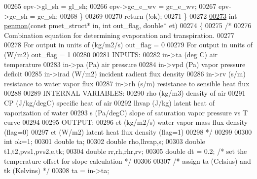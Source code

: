 \begin{DoxyCode}
00265         epv->gl\_sh   = gl\_sh;
00266         epv->gc\_e\_wv = gc\_e\_wv;
00267         epv->gc\_sh   = gc\_sh;
00268     \}
00269     
00270     \textcolor{keywordflow}{return} (!ok);
00271 \}
00272 
\hypertarget{canopy__et_8c_source_l00273}{}\hyperlink{canopy__et_8c_a5c8d396ed94c7e0f3f4c80dd3ecd046c}{00273} \textcolor{keywordtype}{int} \hyperlink{canopy__et_8c_a5c8d396ed94c7e0f3f4c80dd3ecd046c}{penmon}(\textcolor{keyword}{const} pmet\_struct* in, \textcolor{keywordtype}{int} out\_flag,   \textcolor{keywordtype}{double}* et)
00274 \{
00275     \textcolor{comment}{/*}
00276 \textcolor{comment}{    Combination equation for determining evaporation and transpiration. }
00277 \textcolor{comment}{    }
00278 \textcolor{comment}{    For output in units of (kg/m2/s)  out\_flag = 0}
00279 \textcolor{comment}{    For output in units of (W/m2)     out\_flag = 1}
00280 \textcolor{comment}{   }
00281 \textcolor{comment}{    INPUTS:}
00282 \textcolor{comment}{    in->ta     (deg C)   air temperature}
00283 \textcolor{comment}{    in->pa     (Pa)      air pressure}
00284 \textcolor{comment}{    in->vpd    (Pa)      vapor pressure deficit}
00285 \textcolor{comment}{    in->irad   (W/m2)    incident radient flux density}
00286 \textcolor{comment}{    in->rv     (s/m)     resistance to water vapor flux}
00287 \textcolor{comment}{    in->rh     (s/m)     resistance to sensible heat flux}
00288 \textcolor{comment}{}
00289 \textcolor{comment}{    INTERNAL VARIABLES:}
00290 \textcolor{comment}{    rho    (kg/m3)       density of air}
00291 \textcolor{comment}{    CP     (J/kg/degC)   specific heat of air}
00292 \textcolor{comment}{    lhvap  (J/kg)        latent heat of vaporization of water}
00293 \textcolor{comment}{    s      (Pa/degC)     slope of saturation vapor pressure vs T curve}
00294 \textcolor{comment}{}
00295 \textcolor{comment}{    OUTPUT:}
00296 \textcolor{comment}{    et     (kg/m2/s)     water vapor mass flux density  (flag=0)}
00297 \textcolor{comment}{    et     (W/m2)        latent heat flux density       (flag=1)}
00298 \textcolor{comment}{    */}
00299 
00300     \textcolor{keywordtype}{int} ok=1;
00301     \textcolor{keywordtype}{double} ta;
00302     \textcolor{keywordtype}{double} rho,lhvap,s;
00303     \textcolor{keywordtype}{double} t1,t2,pvs1,pvs2,e,tk;
00304     \textcolor{keywordtype}{double} rr,rh,rhr,rv;
00305     \textcolor{keywordtype}{double} dt = 0.2;     \textcolor{comment}{/* set the temperature offset for slope calculation */}
00306    
00307     \textcolor{comment}{/* assign ta (Celsius) and tk (Kelvins) */}
00308     ta = in->ta;

\end{DoxyCode}
